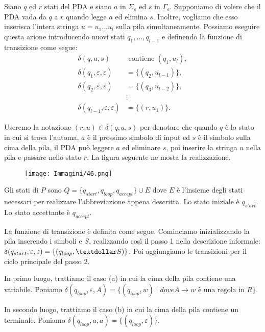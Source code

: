 \documentclass{article}
\begin{document}
Siano $q$ ed $r$ stati del PDA e siano $a$ in $\Sigma_\varepsilon$ ed $s$ in $\Gamma_\varepsilon$.
Supponiamo di volere che il PDA vada da $q$ a $r$ quando legge $a$ ed elimina $s$.
Inoltre, vogliamo che esso inserisca l'intera stringa $u = u_1...u_l$ sulla pila simultaneamente.
Possiamo eseguire questa azione introducendo nuovi stati $q_1,...,q_{l-1}$ e definendo la funzione di transizione come segue:
\[
\begin{aligned}
\delta(q,a,s) & \text{ contiene } (q_1,u_l), \\
\delta(q_1,\varepsilon,\varepsilon) & = \{(q_2,u_{l-1})\}, \\
\delta(q_2,\varepsilon,\varepsilon) & = \{(q_3,u_{l-2})\}, \\
& \vdots \\
\delta(q_{l-1},\varepsilon,\varepsilon) & = \{(r,u_1)\}.
\end{aligned}
\]

Useremo la notazione $(r,u) \in \delta(q,a,s)$ per denotare che quando $q$ è lo stato in cui si trova l'automa, $a$ è il prossimo simbolo di input ed $s$ è il simbolo sulla cima della pila, il PDA può leggere $a$ ed eliminare $s$, poi inserire la stringa $u$ nella pila e passare nello stato $r$. La figura seguente ne mosta la realizzazione.

\begin{figure}[H]
    \centering
    \texttt{[image: Immagini/46.png]}
    \label{fig:notation_example1}
\end{figure}

Gli stati di $P$ sono $Q = \{q_{start},q_{loop},q_{accept}\} \cup E$ dove $E$ è l'insieme degli stati necessari per realizzare l'abbreviazione appena descritta.
Lo stato iniziale è $q_{start}$. Lo stato accettante è $q_{accept}$.

La funzione di transizione è definita come segue. 
Cominciamo inizializzando la pila inserendo i simboli \textdollar \text{ }e $S$, realizzando così il passo 1 nella descrizione informale:
$\delta(q_{start},\varepsilon,\varepsilon) = \{(q_{loop},\textdollar S)\}$.
Poi aggiungiamo le transizioni per il ciclo principale del passo 2.

In primo luogo, trattiamo il caso (a) in cui la cima della pila contiene una variabile.
Poniamo $\delta(q_{loop},\varepsilon,A) = \{(q_{loop},w) \mid dove A \rightarrow w \text{ è una regola in }R\}$.

In secondo luogo, trattiamo il caso (b) in cui la cima della pila contiene un terminale.
Poniamo $\delta(q_{loop},a,a) = \{(q_{loop},\varepsilon)\}$.
\end{document}

